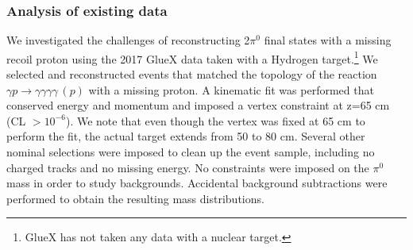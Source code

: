 \subsubsection{Analysis of existing data}
We investigated the challenges of reconstructing 2$\pi^0$ final states
with a missing recoil proton using the 2017 GlueX data taken with a
Hydrogen target.\footnote{GlueX has not taken any data with a nuclear
  target.} We selected and reconstructed events that matched the
topology of the reaction $\gamma p\rightarrow \gamma \gamma \gamma
\gamma\, (p)$ with a missing proton. A kinematic fit was performed
that conserved energy and momentum and imposed a vertex constraint at
z=65 cm (CL $> 10^{-6}$). We note that even though the vertex was
fixed at 65 cm to perform the fit, the actual target extends from 50
to 80 cm. Several other nominal selections were imposed to clean up
the event sample, including no charged tracks and no missing
energy. No constraints were imposed on the $\pi^0$ mass in order to
study backgrounds. Accidental background subtractions were performed
to obtain the resulting mass distributions.
